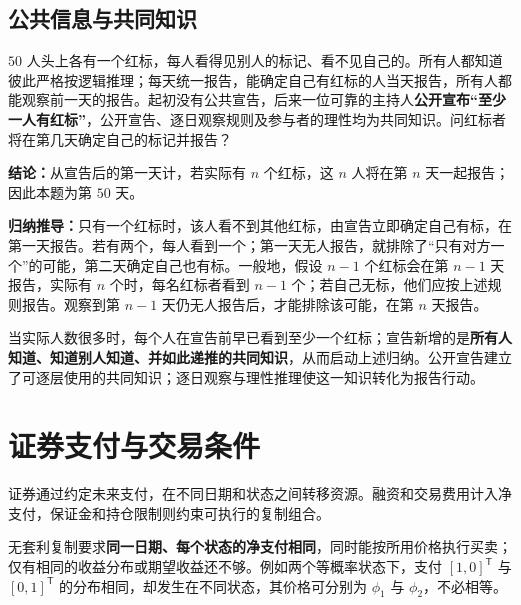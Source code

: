 \subsection{公共信息与共同知识}
\begin{tcolorbox}[example,title=课堂例题：公共宣告与共同知识]
\begin{question}
$50$ 人头上各有一个红标，每人看得见别人的标记、看不见自己的。所有人都知道彼此严格按逻辑推理；每天统一报告，能确定自己有红标的人当天报告，所有人都能观察前一天的报告。起初没有公共宣告，后来一位可靠的主持人\textbf{公开宣布“至少一人有红标”}，公开宣告、逐日观察规则及参与者的理性均为共同知识。问红标者将在第几天确定自己的标记并报告？
\end{question}
\begin{solution}

\textbf{结论：}从宣告后的第一天计，若实际有 $n$ 个红标，这 $n$ 人将在第 $n$ 天一起报告；因此本题为第 $50$ 天。

\textbf{归纳推导：}只有一个红标时，该人看不到其他红标，由宣告立即确定自己有标，在第一天报告。若有两个，每人看到一个；第一天无人报告，就排除了“只有对方一个”的可能，第二天确定自己也有标。一般地，假设 $n-1$ 个红标会在第 $n-1$ 天报告，实际有 $n$ 个时，每名红标者看到 $n-1$ 个；若自己无标，他们应按上述规则报告。观察到第 $n-1$ 天仍无人报告后，才能排除该可能，在第 $n$ 天报告。

\end{solution}

\end{tcolorbox}

当实际人数很多时，每个人在宣告前早已看到至少一个红标；宣告新增的是\textbf{所有人知道、知道别人知道、并如此递推的共同知识}，从而启动上述归纳。公开宣告建立了可逐层使用的共同知识；逐日观察与理性推理使这一知识转化为报告行动。

\section{证券支付与交易条件}
\label{sec:wj-one-6}
证券通过约定未来支付，在不同日期和状态之间转移资源。融资和交易费用计入净支付，保证金和持仓限制则约束可执行的复制组合。

无套利复制要求\textbf{同一日期、每个状态的净支付相同}，同时能按所用价格执行买卖；仅有相同的收益分布或期望收益还不够。例如两个等概率状态下，支付 $[1,0]^{\mathsf T}$ 与 $[0,1]^{\mathsf T}$ 的分布相同，却发生在不同状态，其价格可分别为 $\phi_1$ 与 $\phi_2$，不必相等。


